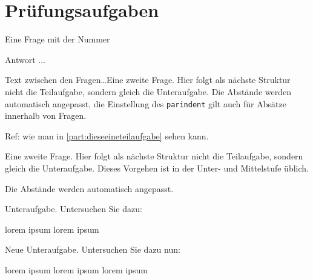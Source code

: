 \documentclass[a4paper,12pt]{article}
\begin{document}
\section{Prüfungsaufgaben}


\question%
	Eine Frage mit der Nummer \thequestion
{}
%
\begin{solution}
	Antwort ...
\end{solution}


Text zwischen den Fragen\ldots Eine zweite Frage. Hier folgt als nächste Struktur nicht die Teilaufgabe, sondern gleich die Unteraufgabe. Die Abstände werden automatisch angepasst, die Einstellung des \texttt{parindent} gilt auch für Absätze innerhalb von Fragen.

Ref: wie man in \ref{part:dieseeineteilaufgabe} sehen kann.


\question%
Eine zweite Frage. Hier folgt als nächste Struktur nicht die Teilaufgabe, sondern gleich die Unteraufgabe. Dieses Vorgehen ist in der Unter- und Mittelstufe üblich.

Die Abstände werden automatisch angepasst.
\begin{subparts}
		\subpart Unteraufgabe. Untersuchen Sie  dazu:
	\begin{subsubparts}
		\subsubpart lorem ipsum
		\subsubpart lorem ipsum
	\end{subsubparts}
		\subpart Neue Unteraufgabe. Untersuchen Sie dazu nun:
	\begin{subsubparts}
		\subsubpart lorem ipsum
		\subsubpart lorem ipsum
		\subsubpart lorem ipsum
	\end{subsubparts}
\end{subparts}
\omitsolution
\end{document}
